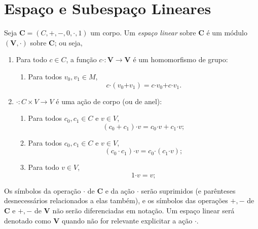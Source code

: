 \section{Espaço e Subespaço Lineares}

\begin{defi}
Seja $\bm C=(C,+,-,0,\cdot,1)$ um corpo. Um \emph{espaço linear} sobre $\bm C$ é um módulo $(\bm V,\bm \cdot)$ sobre $\bm C$; ou seja,
	\begin{enumerate}
	\item  Para todo $c \in C$, a função $c \bm \cdot \colon \bm V \to \bm V$ é um homomorfismo de grupo:
		\begin{enumerate}
		\item Para todos $v_0,v_1 \in M$,
			\begin{equation*}
			c \bm \cdot (v_0 \bm + v_1) = c \bm \cdot v_0 \bm + c \bm \cdot v_1.
			\end{equation*}
		\end{enumerate}
	\item $\bm \cdot \colon C \times V \to V$ é uma ação de corpo (ou de anel):
		\begin{enumerate}
		\item Para todos $c_0,c_1 \in C$ e $v \in V$,
			\begin{equation*}
			(c_0 + c_1) \bm \cdot v = c_0 \bm \cdot v + c_1 \bm \cdot v;
			\end{equation*}
		\item Para todos $c_0,c_1 \in C$ e $v \in V$,
			\begin{equation*}
			(c_0 \cdot c_1) \bm \cdot v = c_0 \bm \cdot (c_1 \bm \cdot v);
			\end{equation*}
		\item Para todo $v \in V$,
			\begin{equation*}
			1 \bm \cdot v = v;
			\end{equation*}
		\end{enumerate}
	\end{enumerate}
Os símbolos da operação $\cdot$ de $\bm C$ e da ação $\bm \cdot$ serão suprimidos (e parênteses desnecessários relacionados a elas também), e os símbolos das operações $+,-$ de $\bm C$ e $\bm +,\bm -$ de $\bm V$ não serão diferenciadas em notação.
Um espaço linear será denotado como $\bm V$ quando não for relevante explicitar a ação $\bm \cdot$.
\end{defi}

